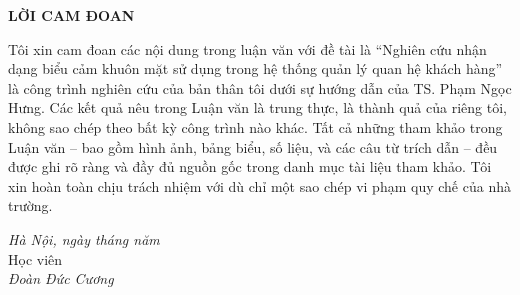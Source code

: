 \documentclass[../LuanVan.tex]{subfiles}
\begin{document}
\begin{center}
    \Large{\textbf{LỜI CAM ĐOAN}}
\end{center}
\vspace{1cm}

Tôi xin cam đoan các nội dung trong luận văn với đề tài là ``Nghiên cứu nhận dạng biểu cảm khuôn mặt sử dụng trong hệ thống quản lý quan hệ khách hàng'' là công trình nghiên cứu của bản thân tôi dưới sự hướng dẫn của TS. Phạm Ngọc Hưng. Các kết quả nêu trong Luận văn là trung thực, là thành quả của riêng tôi, không sao chép theo bất kỳ công trình nào khác. Tất cả những tham khảo trong Luận văn -- bao gồm hình ảnh, bảng biểu, số liệu, và các câu từ trích dẫn -- đều được ghi rõ ràng và đầy đủ nguồn gốc trong danh mục tài liệu tham khảo. Tôi xin hoàn toàn chịu trách nhiệm với dù chỉ một sao chép vi phạm quy chế của nhà trường.

\vspace{0.5cm}
\begin{flushright}
    \begin{minipage}{0.45\textwidth}
        \centering
        \textit{Hà Nội, ngày \hspace{0.8cm} tháng \hspace{0.8cm} năm}\\[0.3cm]
        Học viên\\[2.5cm]
        \textit{Đoàn Đức Cương}
    \end{minipage}
\end{flushright}
\end{document}
